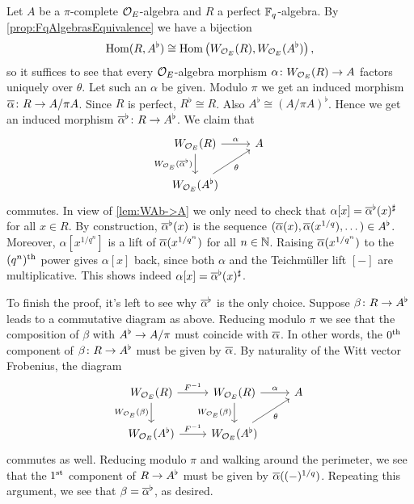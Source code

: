 \documentclass[a4paper, 10pt, oneside, DIV=9, chapterprefix=true, numbers=enddot,bibliography=totoc]{scrbook}
\begin{document}
\begin{proof*}
	Let $A$ be a $\pi$-complete $\mathcal{O}_E$-algebra and $R$ a perfect $\mathbb{F}_q$-algebra. By \cref{prop:FqAlgebrasEquivalence} we have a bijection
	\begin{equation*}
		\operatorname{Hom}(R,A^\flat)\cong \operatorname{Hom}\big(W_{\mathcal{O}_E}(R),W_{\mathcal{O}_E}(A^\flat)\big)\,,
	\end{equation*}
	so it suffices to see that every $\mathcal{O}_E$-algebra morphism $\alpha\colon W_{\Oo_E}(R)\morphism A$ factors uniquely over $\theta$. Let such an $\alpha$ be given. Modulo $\pi$ we get an induced morphism $\ov{\alpha}\colon R\morphism A/\pi A$. Since $R$ is perfect, $R^\flat\cong R$. Also $A^\flat\cong (A/\pi A)^\flat$. Hence we get an induced morphism $\ov{\alpha}^\flat\colon R\morphism A^\flat$. We claim that
	\begin{equation*}
		\begin{tikzcd}
			W_{\Oo_E}(R)\dar["W_{\Oo_E}(\ov{\alpha}^\flat)"{swap}]\rar["\alpha"]& A\\
			W_{\Oo_E}(A^\flat)\urar["\theta"{swap}]&
		\end{tikzcd}
	\end{equation*}
	commutes. In view of \cref{lem:WAb->A} we only need to check that $\alpha[x]=\ov{\alpha}^\flat(x)^\sharp$ for all $x\in R$. By construction, $\ov{\alpha}^\flat(x)$ is the sequence $(\ov{\alpha}(x),\ov{\alpha}(x^{1/q}),\dotsc)\in A^\flat$. Moreover, $\alpha[x^{1/q^n}]$ is a lift of $\ov{\alpha}(x^{1/q^n})$ for all $n\in\mathbb{N}$. Raising $\ov{\alpha}(x^{1/q^n})$ to the $(q^n)^{\text{th}}$ power gives $\alpha[x]$ back, since both $\alpha$ and the Teichmüller lift $[-]$ are multiplicative. This shows indeed $\alpha[x]=\ov{\alpha}^\flat(x)^\sharp$.
	
	To finish the proof, it's left to see why $\ov{\alpha}^\flat$ is the only choice. Suppose $\beta\colon R\morphism A^\flat$ leads to a commutative diagram as above. Reducing modulo $\pi$ we see that the composition of $\beta$ with $A^\flat\morphism A/\pi$ must coincide with $\ov{\alpha}$. In other words, the $0^{\text{th}}$ component of $\beta\colon R\morphism A^\flat$ must be given by $\ov{\alpha}$. By naturality of the Witt vector Frobenius, the diagram
	\begin{equation*}
		\begin{tikzcd}
		W_{\Oo_E}(R)\rar["F^{-1}"]\dar["W_{\Oo_E}(\beta)"{swap}"]& W_{\Oo_E}(R)\dar["W_{\Oo_E}(\beta)"{swap}]\rar["\alpha"]& A\\
		W_{\Oo_E}(A^\flat)\rar["F^{-1}"] & W_{\Oo_E}(A^\flat)\urar["\theta"{swap}]&
		\end{tikzcd}
	\end{equation*}
	commutes as well. Reducing modulo $\pi$ and walking around the perimeter, we see that the $1^{\text{st}}$ component of $R\morphism A^\flat$ must be given by $\ov{\alpha}((-)^{1/q})$. Repeating this argument, we see that $\beta=\ov{\alpha}^\flat$, as desired.
\end{proof*}
\end{document}
